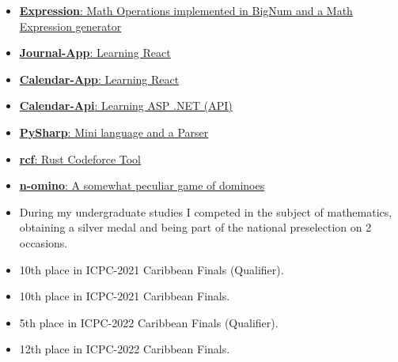\documentclass[9pt]{developercv} %
\begin{document}
\begin{minipage}[t]{0.45\textwidth}
	\vspace{-\baselineskip} %


	\begin{itemize}
		\item {\href{https://github.com/raudel25/Expression}{\textbf{Expression}: Math Operations implemented in BigNum and a Math Expression generator}}
		\item {\href{https://github.com/raudel25/Journal-App}{\textbf{Journal-App}: Learning React}}
		\item {\href{https://github.com/raudel25/Calendar-App}{\textbf{Calendar-App}: Learning React}}
		\item {\href{https://github.com/raudel25/Calendar-Api}{\textbf{Calendar-Api}: Learning ASP .NET (API)}}
		\item {\href{https://github.com/raudel25/PySharp}{\textbf{PySharp}: Mini language and a Parser}}
		\item {\href{https://github.com/raudel25/rcf}{\textbf{rcf}: Rust Codeforce Tool}}
		\item {\href{https://github.com/raudel25/n-omino}{\textbf{n-omino}: A somewhat peculiar game of dominoes}}
	\end{itemize}
\end{minipage}
\hfill
\begin{minipage}[t]{0.45\textwidth}
	\vspace{-\baselineskip} %


	\begin{itemize}
		\item During my undergraduate studies I competed in the subject of mathematics, obtaining a
		      silver medal and being part of the national preselection on 2 occasions.
		\item 10th place in ICPC-2021 Caribbean Finals (Qualifier).
		\item 10th place in ICPC-2021 Caribbean Finals.
		\item 5th place in ICPC-2022 Caribbean Finals (Qualifier).
		\item 12th place in ICPC-2022 Caribbean Finals.
	\end{itemize}

\end{minipage}



\end{document}
